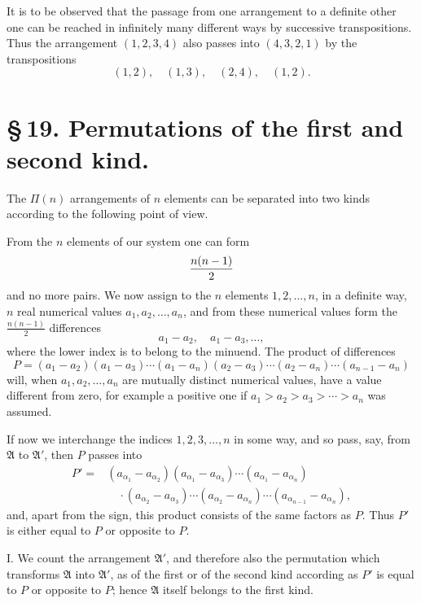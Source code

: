 \documentclass[11pt]{article}
\begin{document}
It is to be observed that the passage from one arrangement to a definite other one can be reached in infinitely many different ways by successive transpositions. Thus the arrangement \((1,2,3,4)\) also passes into \((4,3,2,1)\) by the transpositions
\[
 (1,2),\quad (1,3),\quad (2,4),\quad (1,2).
\]

\section*{\S\,19. Permutations of the first and second kind.}

The \(\Pi(n)\) arrangements of \(n\) elements can be separated into two kinds according to the following point of view.

From the \(n\) elements of our system one can form
\[
 {n(n-1)\over 2}
\]
and no more pairs. We now assign to the \(n\) elements \(1,2,\ldots,n\), in a definite way, \(n\) real numerical values \(a_1,a_2,\ldots,a_n\), and from these numerical values form the \(\frac{n(n-1)}{2}\) differences
\[
 a_1-a_2,\quad a_1-a_3,\ldots,
\]
where the lower index is to belong to the minuend. The product of differences
\begin{equation}
 P=(a_1-a_2)(a_1-a_3)\cdots(a_1-a_n)
    (a_2-a_3)\cdots(a_2-a_n)\cdots(a_{n-1}-a_n)
\tag{1}
\end{equation}
will, when \(a_1,a_2,\ldots,a_n\) are mutually distinct numerical values, have a value different from zero, for example a positive one if \(a_1>a_2>a_3>\cdots>a_n\) was assumed.

If now we interchange the indices \(1,2,3,\ldots,n\) in some way, and so pass, say, from \(\mathfrak A\) to \(\mathfrak A'\), then \(P\) passes into
\begin{equation}
\begin{aligned}
 P'={}&(a_{\alpha_1}-a_{\alpha_2})(a_{\alpha_1}-a_{\alpha_3})\cdots
       (a_{\alpha_1}-a_{\alpha_n})\\
     &\quad\cdot(a_{\alpha_2}-a_{\alpha_3})\cdots(a_{\alpha_2}-a_{\alpha_n})
       \cdots(a_{\alpha_{n-1}}-a_{\alpha_n}),
\end{aligned}
\tag{2}
\end{equation}
and, apart from the sign, this product consists of the same factors as \(P\). Thus \(P'\) is either equal to \(P\) or opposite to \(P\).

I. We count the arrangement \(\mathfrak A'\), and therefore also the permutation which transforms \(\mathfrak A\) into \(\mathfrak A'\), as of the first or of the second kind according as \(P'\) is equal to \(P\) or opposite to \(P\); hence \(\mathfrak A\) itself belongs to the first kind.
\end{document}
